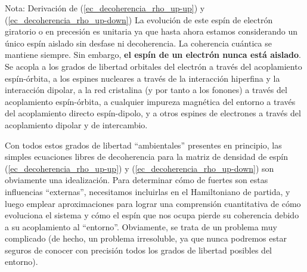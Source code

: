 \documentclass[a4paper,11pt]{book} %
\numberwithin{equation}{chapter}
\begin{document}
\begin{mybox_blue}{Nota: Derivación de (\ref{ec_decoherencia_rho_up-up}) y  (\ref{ec_decoherencia_rho_up-down})}
La evolución de este espín de electrón giratorio o en precesión es unitaria ya que hasta ahora estamos considerando un único espín aislado sin desfase ni decoherencia. La coherencia cuántica se mantiene siempre. Sin embargo, \textbf{el espín de un electrón nunca está aislado}. Se acopla a los grados de libertad orbitales del electrón a través del acoplamiento espín-órbita, a los espines nucleares a través de la interacción hiperfina y la interacción dipolar, a la red cristalina (y por tanto a los fonones) a través del acoplamiento espín-órbita, a cualquier impureza magnética del entorno a través del acoplamiento directo espín-dipolo, y a otros espines de electrones a través del acoplamiento dipolar y de intercambio. 

Con todos estos grados de libertad ``ambientales'' presentes en principio, las simples ecuaciones libres de decoherencia para la matriz de densidad de espín (\ref{ec_decoherencia_rho_up-up}) y (\ref{ec_decoherencia_rho_up-down}) son obviamente una idealización. Para determinar cómo de fuertes son estas influencias ``externas'', necesitamos incluirlas en el Hamiltoniano de partida, y luego emplear aproximaciones para lograr una comprensión cuantitativa de cómo evoluciona el sistema y cómo el espín que nos ocupa pierde su coherencia debido a su acoplamiento al ``entorno''. Obviamente, se trata de un problema muy complicado (de hecho, un problema irresoluble, ya que nunca podremos estar seguros de conocer con precisión todos los grados de libertad posibles del entorno). 


\end{mybox_blue}
\end{document}
